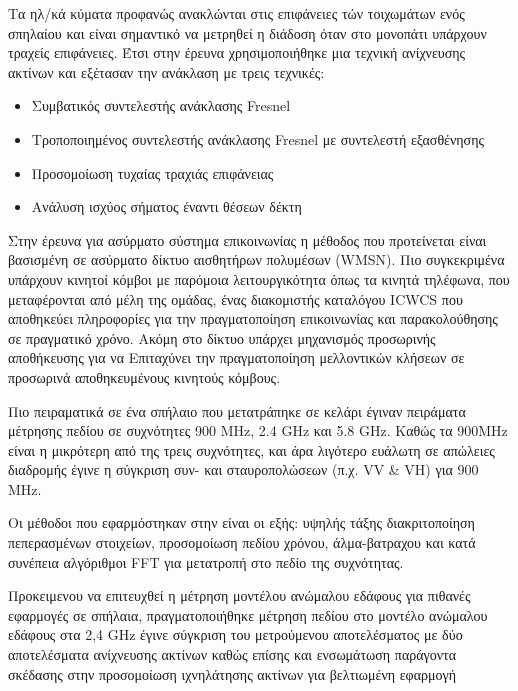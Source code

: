     Τα ηλ/κά κύματα προφανώς ανακλώνται στις επιφάνειες τών τοιχωμάτων ενός σπηλαίου και
    είναι σημαντικό να μετρηθεί η διάδοση όταν στο μονοπάτι υπάρχουν τραχείς επιφάνειες.
    Έτσι στην έρευνα \cite{soo_investigation_2018} χρησιμοποιήθηκε μια τεχνική ανίχνευσης 
    ακτίνων και εξέτασαν την ανάκλαση με τρεις τεχνικές:
    \begin{itemize}
        \item Συμβατικός συντελεστής ανάκλασης Fresnel
        \item Τροποποιημένος συντελεστής ανάκλασης Fresnel με συντελεστή εξασθένησης
        \item Προσομοίωση τυχαίας τραχιάς επιφάνειας
        \item Ανάλυση ισχύος σήματος έναντι θέσεων δέκτη
    \end{itemize}

    Στην έρευνα για ασύρματο σύστημα επικοινωνίας \cite{yavuz_-cave_2009} η μέθοδος που
    προτείνεται είναι βασισμένη σε ασύρματο δίκτυο αισθητήρων πολυμέσων (WMSN). Πιο
    συγκεκριμένα υπάρχουν κινητοί κόμβοι με παρόμοια λειτουργικότητα όπως τα κινητά τηλέφωνα,
    που μεταφέρονται από μέλη της ομάδας, ένας διακομιστής καταλόγου ICWCS που αποθηκεύει
    πληροφορίες για την πραγματοποίηση επικοινωνίας και παρακολούθησης σε πραγματικό χρόνο. Ακόμη
    στο δίκτυο υπάρχει μηχανισμός προσωρινής αποθήκευσης για να Επιταχύνει την πραγματοποίηση
    μελλοντικών κλήσεων σε προσωρινά αποθηκευμένους κινητούς κόμβους.
    
    Πιο πειραματικά σε ένα σπήλαιο που μετατράπηκε σε κελάρι \cite{soo_propagation_2018}
    έγιναν πειράματα μέτρησης πεδίου σε συχνότητες 900 MHz, 2.4 GHz και 5.8 GHz. Καθώς
    τα 900MHz είναι η μικρότερη από της τρεις συχνότητες, και άρα λιγότερο ευάλωτη σε 
    απώλειες διαδρομής έγινε η σύγκριση συν- και σταυροπολώσεων (π.χ. VV \& VH) για 900 MHz.
    
    Οι μέθοδοι που εφαρμόστηκαν στην \cite{pingenot_full_2005} είναι οι εξής: υψηλής τάξης
    διακριτοποίηση πεπερασμένων στοιχείων, προσομοίωση πεδίου χρόνου, άλμα-βατραχου και
    κατά συνέπεια αλγόριθμοι FFT για μετατροπή στο πεδίο της συχνότητας.

    Προκειμενου να επιτευχθεί η μέτρηση μοντέλου ανώμαλου εδάφους για πιθανές εφαρμογές
    σε σπήλαια, πραγματοποιήθηκε μέτρηση πεδίου στο μοντέλο ανώμαλου εδάφους στα 2,4 GHz
    έγινε σύγκριση του μετρούμενου αποτελέσματος με δύο αποτελέσματα ανίχνευσης ακτίνων
    καθώς επίσης και ενσωμάτωση παράγοντα σκέδασης στην προσομοίωση ιχνηλάτησης ακτίνων
    για βελτιωμένη εφαρμογή


